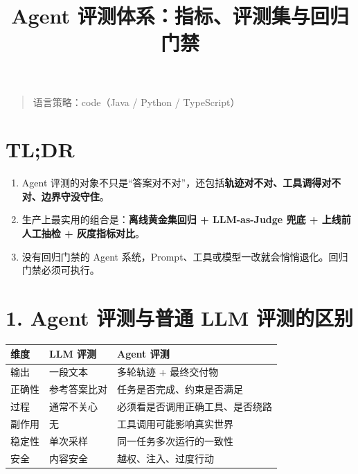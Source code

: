 \documentclass[9pt,a4paper,twocolumn]{ctexart}
\begin{document}
\title{Agent 评测体系：指标、评测集与回归门禁}
\date{}
\maketitle
{}

\begin{quote}
语言策略：code（Java / Python / TypeScript）
\end{quote}



\section*{TL;DR}

\begin{enumerate}[itemsep=1pt, topsep=2pt]
  \item Agent 评测的对象不只是“答案对不对”，还包括\textbf{轨迹对不对、工具调得对不对、边界守没守住}。
  \item 生产上最实用的组合是：\textbf{离线黄金集回归 + LLM-as-Judge 兜底 + 上线前人工抽检 + 灰度指标对比}。
  \item 没有回归门禁的 Agent 系统，Prompt、工具或模型一改就会悄悄退化。回归门禁必须可执行。
\end{enumerate}


\section*{1. Agent 评测与普通 LLM 评测的区别}

{\footnotesize
\begin{tabular}{|p{}|p{}|p{}|}
\hline
\textbf{维度} & \textbf{LLM 评测} & \textbf{Agent 评测} \\
\hline
输出 & 一段文本 & 多轮轨迹 + 最终交付物 \\
\hline
正确性 & 参考答案比对 & 任务是否完成、约束是否满足 \\
\hline
过程 & 通常不关心 & 必须看是否调用正确工具、是否绕路 \\
\hline
副作用 & 无 & 工具调用可能影响真实世界 \\
\hline
稳定性 & 单次采样 & 同一任务多次运行的一致性 \\
\hline
安全 & 内容安全 & 越权、注入、过度行动 \\
\hline
\end{tabular}
}
\end{document}
